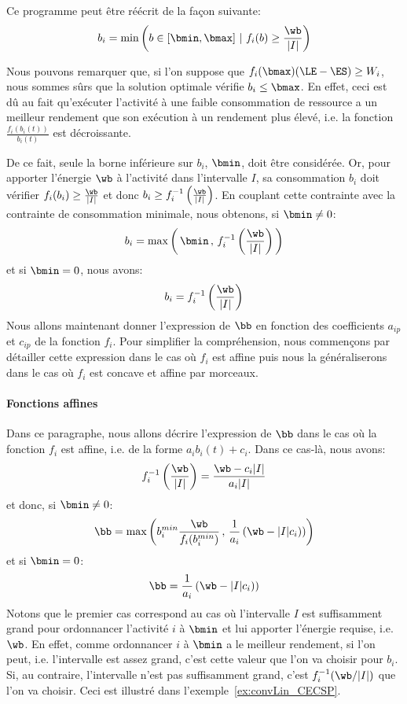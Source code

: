 Ce programme peut être réécrit de la façon suivante: 
\[ b_i=\min\left( b \in [\bmin,\bmax]\ |\ f_i(b) \ge
    \frac{\wb}{|I|}\right)
\]

Nous pouvons remarquer que, si l'on suppose que $f_i(\bmax) (\LE - \ES
) \ge W_i$, nous sommes sûrs que la solution optimale vérifie $b_i \le
\bmax$. En effet, ceci est dû au fait qu'exécuter l'activité à une
faible consommation de ressource a un meilleur rendement que son
exécution à un rendement plus élevé, i.e. la fonction
$\frac{f_i(b_i(t))}{b_i(t)}$ est décroissante. 

De ce fait, seule la borne inférieure sur $b_i$, $\bmin$, doit être
considérée. Or, pour apporter l'énergie $\wb$ à l'activité dans
l'intervalle $I$, sa consommation $b_i$ doit vérifier $f_i(b_i) \ge
\frac{\wb}{|I|}$ et donc $b_i \ge
f_i^{-1}\left(\frac{\wb}{|I|}\right)$. En couplant cette contrainte
avec la contrainte de consommation minimale, nous obtenons, si $\bmin
\neq 0$:
\[
  b_i= \max\left(\, \bmin \, ,\, 
    f_i^{-1}\left(\frac{\wb}{|I|}\right)\, \right)
\]
et si $\bmin = 0$, nous avons:
\[
  b_i=  f_i^{-1}\left(\frac{\wb}{|I|}\right)
\]
Nous allons maintenant donner l'expression de $\bb$  en fonction des
coefficients $a_{ip}$  et $c_{ip}$ de la fonction $f_i$. Pour
simplifier la compréhension, nous commençons par détailler cette
expression dans le cas où $f_i$ est affine puis nous la généraliserons
dans le cas où $f_i$ est concave et affine par morceaux. 

\paragraph{Fonctions affines}

Dans ce paragraphe, nous allons décrire l'expression de $\bb$ dans le
cas où la fonction $f_i$ est affine, i.e. de la forme $a_ib_i(t)+c_i$. Dans
ce cas-là, nous avons:  
\[f_i^{-1}\left( \frac{\wb}{|I|}\right)= \frac{ \wb- c_i|I|}{a_i|I|}
\]
et donc, si $\bmin\neq 0$: 
\begin{equation}
  \bb= \max\left(b_i^{min} \frac{\wb}{f_i(b_i^{min})} \, ,\,  
    \frac{1}{a_i}\left(\wb-|I|c_{i})\right)\right)
\end{equation}
et si $\bmin=0$: 
\[
  \bb=  \frac{1}{a_i}\left(\wb-|I|c_{i})\right)
\]
Notons que le premier cas correspond au cas où l'intervalle $I$ est
suffisamment grand pour ordonnancer l'activité $i$ à $\bmin$ et lui
apporter l'énergie requise, i.e. $\wb$. En effet, comme ordonnancer
$i$ à $\bmin$ a le meilleur rendement, si l'on peut, i.e. l'intervalle
est assez grand, c'est cette valeur que l'on va choisir pour
$b_i$. Si, au contraire, l'intervalle n'est pas suffisamment grand,
c'est $f_i^{-1}(\wb/|I|) $ que l'on va choisir. Ceci est illustré dans
l'exemple~\ref{ex:convLin_CECSP}. 

